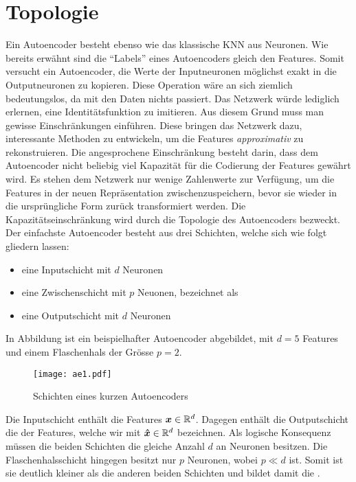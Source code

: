 \section{Topologie}
Ein Autoencoder besteht ebenso wie das klassische KNN aus Neuronen.
Wie bereits erwähnt sind die ``Labels'' eines Autoencoders gleich
den Features. Somit versucht ein Autoencoder, die Werte der Inputneuronen
möglichst exakt in die Outputneuronen zu kopieren.
Diese Operation wäre an sich ziemlich bedeutungslos, da mit den
Daten nichts passiert. Das Netzwerk würde lediglich erlernen, eine
Identitätsfunktion zu imitieren.
Aus diesem Grund muss man gewisse Einschränkungen einführen. Diese bringen das Netzwerk dazu,
interessante Methoden zu entwickeln, um die Features \textit{approximativ} zu rekonstruieren.
\para{}
Die angesprochene Einschränkung besteht darin, dass dem Autoencoder nicht
beliebig viel Kapazität für die Codierung der Features gewährt wird.
Es stehen dem Netzwerk nur wenige Zahlenwerte zur Verfügung, um die Features
in der neuen Repräsentation zwischenzuspeichern, bevor sie wieder in die
ursprüngliche Form zurück transformiert werden.
Die Kapazitätseinschränkung wird durch die Topologie des Autoencoders bezweckt.
\para{}
\bigskip
Der einfachste Autoencoder besteht aus drei Schichten, welche sich wie folgt
gliedern lassen:
\begin{itemize}
\item{eine Inputschicht mit $d$ Neuronen}
\item{eine Zwischenschicht mit $p$ Neuonen, bezeichnet als }
\item{eine Outputschicht mit $d$ Neuronen}
\end{itemize}
In Abbildung  ist
ein beispielhafter Autoencoder abgebildet, mit $d = 5$ Features und einem
Flaschenhals der Grösse $p = 2$.
\begin{figure}[h!]
  \centering
  \texttt{[image: ae1.pdf]}
  \caption{Schichten eines kurzen Autoencoders}
  \label{fig:basic_autoencoder}
\end{figure}
\para{}
Die Inputschicht enthält die Features $\bm{x} \in \mathbb{R}^d$. Dagegen enthält die Outputschicht
die  der Features, welche wir mit $\bm{\hat{x}} \in \mathbb{R}^d$
bezeichnen. Als logische Konsequenz müssen die beiden Schichten die gleiche
Anzahl $d$ an Neuronen besitzen.
Die Flaschenhalsschicht hingegen besitzt nur $p$ Neuronen, wobei $p \ll d$ ist.
Somit ist sie deutlich kleiner als die anderen beiden Schichten und bildet
damit die .
